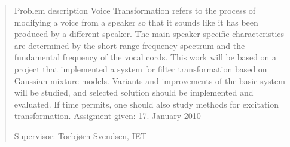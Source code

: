 
\begin{quotation}
\noindent
Problem description
\newline \newline 
\noindent
Voice Transformation refers to the process of modifying a voice from a speaker so that it sounds like it has been produced by a different speaker. The main speaker-specific characteristics are determined by the short range frequency spectrum and the fundamental frequency of the vocal cords. This work will be based on a project that implemented a system for filter transformation based on Gaussian mixture models. Variants and improvements of the basic system will be studied, and selected solution should be implemented and evaluated. If time permits, one should also study methods for excitation transformation.
\newline \newline \newline
\noindent
Assigment given: 17. January 2010

\noindent
Supervisor: Torbjørn Svendsen, IET

\end{quotation}